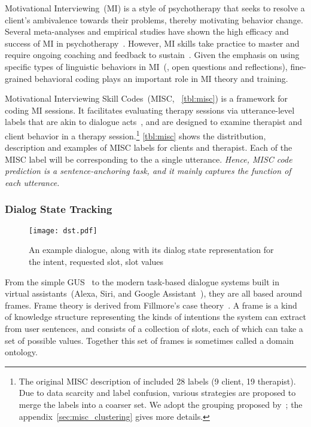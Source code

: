 Motivational Interviewing~(MI) is a style of psychotherapy that seeks
to resolve a client's ambivalence towards their problems, thereby
motivating behavior change. Several meta-analyses and empirical
studies have shown the high efficacy and success of MI in
psychotherapy~\citep{burke2004emerging, martins2009review,
  lundahl2010meta}. However, MI skills take practice to master and
require ongoing coaching and feedback to sustain~\citep{Schwalbe2014}.
Given the emphasis on using specific types of linguistic behaviors in
MI~(\eg, open questions and reflections), fine-grained behavioral
coding plays an important role in MI theory and training.

Motivational Interviewing Skill Codes~(MISC, ~\autoref{tbl:misc}) is a
framework for coding MI sessions. It facilitates evaluating therapy
sessions via utterance-level labels that are akin to dialogue
acts~\citep{stolcke2000dialogue,jurafsky2018speech}, and are designed
to examine therapist and client behavior in a therapy
session.\footnote{The original MISC description of
  \citet{miller2003manual} included 28 labels (9 client, 19
  therapist). Due to data scarcity and label confusion, various
  strategies are proposed to merge the labels into a coarser set.  We
  adopt the grouping proposed by~\citet{xiao2016behavioral}; the
  appendix~\autoref{sec:misc_clustering} gives more details.}
\autoref{tbl:misc} shows the distritbution, description and examples
of MISC labels for clients and therapist. Each of the MISC label will
be corresponding to the a single utterance. \textit{Hence, MISC code
prediction is a sentence-anchoring task, and it mainly captures the
function of each utterance.}

\subsubsection{Dialog State Tracking}
\label{ssec:bg:dialogue-state}

\begin{figure}[!ht]
\centering
  \texttt{[image: dst.pdf]}
  \caption{\label{fig:dst} An example dialogue, along with its dialog state representation for  the intent, requested slot, slot values}
\end{figure}

From the simple GUS~\citep{bobrow1977gus} to the modern task-based
dialogue systems built in virtual assistants~(Alexa, Siri, and Google
Assistant~\etal), they are all based around frames. Frame theory is
derived from Fillmore's case theory~\citep{Fillmore:68}. A frame is a
kind of knowledge structure representing the kinds of intentions the
system can extract from user sentences, and consists of a collection
of slots, each of which can take a set of possible values. Together
this set of frames is sometimes called a domain ontology.

